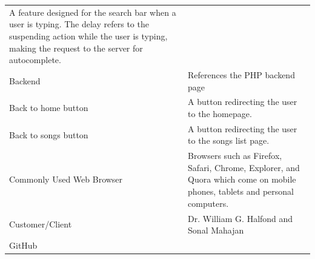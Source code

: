 \documentclass[]{article}
\begin{document}
\begin{longtable}[c]{@{}ll@{}}
\begin{minipage}[t]{0.47\columnwidth}
A feature designed for the search bar when a user is typing. The delay
refers to the suspending action while the user is typing, making the
request to the server for autocomplete.
\end{minipage}
\\\addlinespace
\begin{minipage}[t]{0.47\columnwidth}\raggedright
Backend
\end{minipage} & \begin{minipage}[t]{0.47\columnwidth}\raggedright
References the PHP backend page
\end{minipage}
\\\addlinespace
\begin{minipage}[t]{0.47\columnwidth}\raggedright
Back to home button
\end{minipage} & \begin{minipage}[t]{0.47\columnwidth}\raggedright
A button redirecting the user to the homepage.
\end{minipage}
\\\addlinespace
\begin{minipage}[t]{0.47\columnwidth}\raggedright
Back to songs button
\end{minipage} & \begin{minipage}[t]{0.47\columnwidth}\raggedright
A button redirecting the user to the songs list page.
\end{minipage}
\\\addlinespace
\begin{minipage}[t]{0.47\columnwidth}\raggedright
Commonly Used Web Browser
\end{minipage} & \begin{minipage}[t]{0.47\columnwidth}\raggedright
Browsers such as Firefox, Safari, Chrome, Explorer, and Quora which come
on mobile phones, tablets and personal computers.
\end{minipage}
\\\addlinespace
\begin{minipage}[t]{0.47\columnwidth}\raggedright
Customer/Client
\end{minipage} & \begin{minipage}[t]{0.47\columnwidth}\raggedright
Dr. William G. Halfond and Sonal Mahajan
\end{minipage}
\\\addlinespace
\begin{minipage}[t]{0.47\columnwidth}\raggedright
GitHub
\end{minipage} & \begin{minipage}[t]{0.47\columnwidth}\raggedright

\end{minipage}
\end{longtable}
\end{document}
